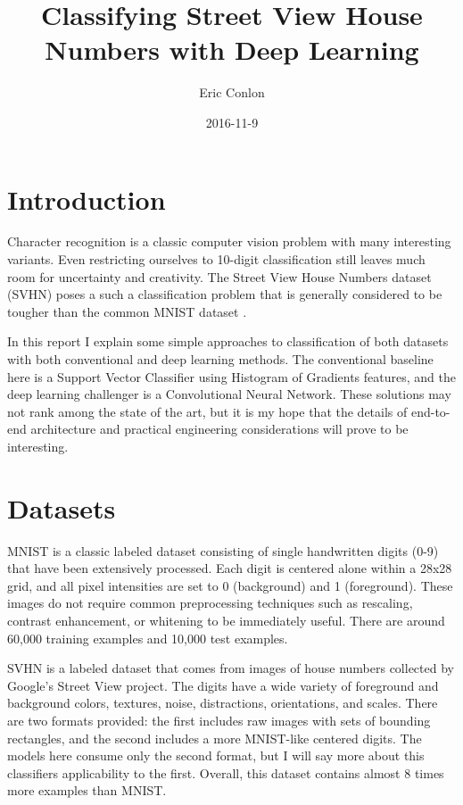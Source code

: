 \documentclass{article}
\begin{document}
\author{Eric Conlon}
\title{Classifying Street View House Numbers with Deep Learning}
\date{2016-11-9}

\maketitle{} %

\tableofcontents{} %

\section{Introduction}

Character recognition is a classic computer vision problem with many interesting variants. Even restricting ourselves to 10-digit classification still leaves much room for uncertainty and creativity. The Street View House Numbers dataset (SVHN) \cite{netzer2011reading} poses a such a classification problem that is generally considered to be tougher than the common MNIST dataset \cite{lecun1998mnist}.

In this report I explain some simple approaches to classification of both datasets with both conventional and deep learning methods. The conventional baseline here is a Support Vector Classifier using Histogram of Gradients features, and the deep learning challenger is a Convolutional Neural Network. These solutions may not rank among the state of the art, but it is my hope that the details of end-to-end architecture and practical engineering considerations will prove to be interesting.

\section{Datasets}

MNIST is a classic labeled dataset consisting of single handwritten digits (0-9) that have been extensively processed. Each digit is centered alone within a 28x28 grid, and all pixel intensities are set to 0 (background) and 1 (foreground). These images do not require common preprocessing techniques such as rescaling, contrast enhancement, or whitening to be immediately useful. There are around 60,000 training examples and 10,000 test examples.

SVHN is a labeled dataset that comes from images of house numbers collected by Google's Street View project. The digits have a wide variety of foreground and background colors, textures, noise, distractions, orientations, and scales. There are two formats provided: the first includes raw images with sets of bounding rectangles, and the second includes a more MNIST-like centered digits. The models here consume only the second format, but I will say more about this classifiers applicability to the first. Overall, this dataset contains almost 8 times more examples than MNIST.
\end{document}
